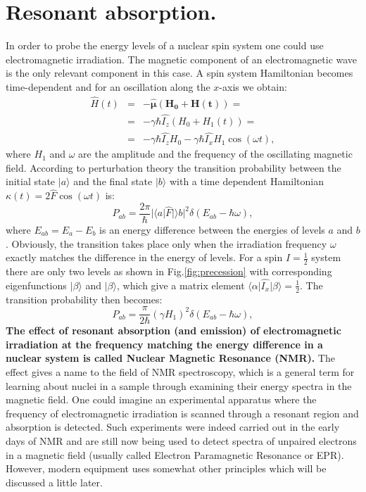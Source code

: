\documentclass[a4paper, 12pt]{article}
\begin{document}
\section{Resonant absorption.} \label{Res_absorbtion}

 In order to probe the energy levels of a nuclear spin system one could use electromagnetic irradiation. The magnetic component of an electromagnetic wave is the only relevant component in this case. A spin system Hamiltonian becomes time-dependent and for an oscillation along the $x$-axis we obtain:
\begin{equation} \label{eq:oscillating_field}
\begin{array}{lcl}
\hat{H}(t) &=& -\bm{\hat{\mu}} \bm{(H_0+H(t))}=  \\
 &=& -\gamma \hbar \hat{I_z} (H_0 + H_1(t)) =\\
 &=&-\gamma \hbar \hat{I_z} H_0  -\gamma \hbar \hat{I_x} H_1 \cos(\omega t),
\end{array}
\end{equation}
where $H_1$ and $\omega$ are the amplitude and the frequency of the oscillating magnetic field. According to perturbation theory the transition probability between the initial state $\vert a \rangle$ and the final state $\vert b \rangle$ with a time dependent Hamiltonian $ \kappa (t) = 2 \hat{F} \cos (\omega t ) $ is:
\begin{equation} \label{eq:probability}
P_{ab} = \frac{2 \pi}{\hbar} \vert \langle a \vert \hat{F} \vert \rangle b \vert ^2 \delta(E_{ab}-\hbar \omega),
\end{equation}
where $E_{ab} = E_a - E_b$ is an energy difference between the energies of levels $a$ and $b$. Obviously, the transition takes place only when the irradiation frequency $\omega$ exactly matches the difference in the energy of levels. For a spin $I = \frac{1}{2}$ system there are only two levels as shown in Fig.\ref{fig:precession} with corresponding eigenfunctions $\vert \beta \rangle$ and $\vert \beta \rangle$, which give a matrix element $\langle \alpha\vert \hat{I_x} \vert \beta \rangle = \frac{1}{2}$. The transition probability then becomes:
\begin{equation}
P_{ab} = \frac{\pi}{2\hbar} (\gamma H_1)^2 \delta(E_{ab}-\hbar \omega),
\end{equation}
 \textbf{The effect of resonant absorption (and emission) of electromagnetic irradiation at the frequency matching the energy difference in a nuclear system is called Nuclear Magnetic Resonance (NMR).} The effect gives a name to the field of NMR spectroscopy, which is a general term for learning about nuclei in a sample through examining their energy spectra in the magnetic field. One could imagine an experimental apparatus where the frequency of electromagnetic irradiation  is scanned through a resonant region and absorption is detected. Such experiments were indeed carried out in the early days of NMR and are still now being used to detect spectra of unpaired electrons in a magnetic field (usually called Electron Paramagnetic Resonance or EPR). However, modern equipment uses somewhat other principles which will be discussed a little later.
\end{document}
